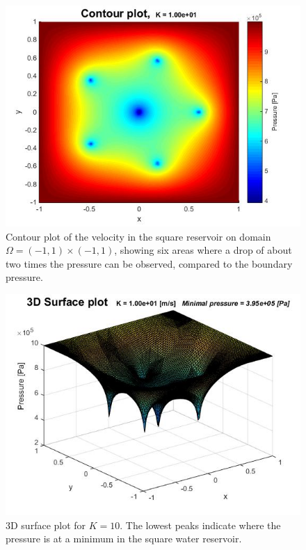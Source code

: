 \documentclass[a4paper]{report}
\begin{document}
\begin{figure}
	\centering
	\includegraphics[width=130mm]{K10_contour.jpg}
	\caption{Contour plot of the velocity in the square reservoir on domain $\Omega=(-1,1)\times(-1,1)$, showing six areas where a drop of about two times the pressure can be observed, compared to the boundary pressure.
	\label{overflow}}
\end{figure}

\begin{figure}
	\centering
	\includegraphics[width=130mm]{K10_3Dsurface.jpg}
	\caption{3D surface plot for $K=10$. The lowest peaks indicate where the pressure is at a minimum in the square water reservoir.
	\label{overflow}}
\end{figure}
\end{document}
